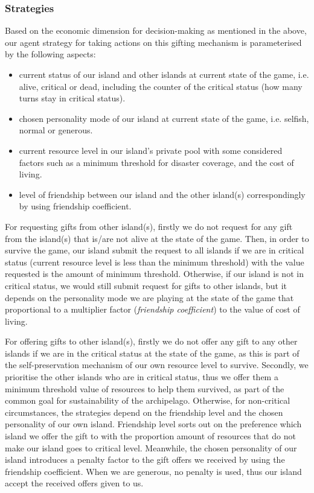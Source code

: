 \subsubsection{Strategies} \label{subsubsec:Team6_IITO:Strategies}
Based on the economic dimension for decision-making as mentioned in the above, our agent strategy for taking actions on this gifting mechanism is parameterised by the following aspects:
\begin{itemize}
    \item current status of our island and other islands at current state of the game, i.e. alive, critical or dead, including the counter of the critical status (how many turns stay in critical status).
    \item chosen personality mode of our island at current state of the game, i.e. selfish, normal or generous.
    \item current resource level in our island's private pool with some considered factors such as a minimum threshold for disaster coverage, and the cost of living.
    \item level of friendship between our island and the other island(s) correspondingly by using friendship coefficient.
\end{itemize}
For requesting gifts from other island(s), firstly we do not request for any gift from the island(s) that is/are not alive at the state of the game. Then, in order to survive the game, our island submit the request to all islands if we are in critical status (current resource level is less than the minimum threshold) with the value requested is the amount of minimum threshold. Otherwise, if our island is not in critical status, we would still submit request for gifts to other islands, but it depends on the personality mode we are playing at the state of the game that proportional to a multiplier factor (\emph{friendship coefficient}) to the value of cost of living.

For offering gifts to other island(s), firstly we do not offer any gift to any other islands if we are in the critical status at the state of the game, as this is part of the self-preservation mechanism of our own resource level to survive. Secondly, we prioritise the other islands who are in critical status, thus we offer them a minimum threshold value of resources to help them survived, as part of the common goal for sustainability of the archipelago. Otherwise, for non-critical circumstances, the strategies depend on the friendship level and the chosen personality of our own island. Friendship level sorts out on the preference which island we offer the gift to with the proportion amount of resources that do not make our island goes to critical level. Meanwhile, the chosen personality of our island introduces a penalty factor to the gift offers we received by using the friendship coefficient. When we are generous, no penalty is used, thus our island accept the received offers given to us.

